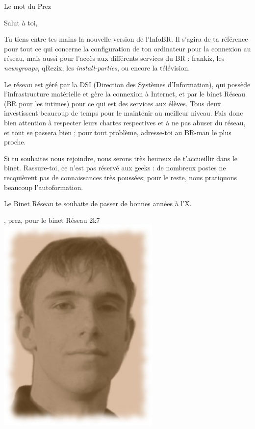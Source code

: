 

\begin{center}
    { \Huge Le mot du Prez }
\end{center}

\indent \indent Salut \`a toi,

Tu tiens entre tes mains la nouvelle version de l'InfoBR. Il s'agira de ta référence pour tout ce qui concerne la configuration de ton ordinateur pour la connexion au réseau, mais aussi pour l'accès aux différents services du BR :
frankiz, les \emph{newsgroups}, qRezix, les \emph{install-parties}, ou encore la télévision.

Le réseau est géré par la DSI (Direction des Systèmes d'Information), qui possède l'infrastructure matérielle et gère la connexion \`a Internet,
et par le binet Réseau (BR pour les intimes) pour ce qui est des services aux élèves. Tous deux investissent beaucoup de temps pour le maintenir au meilleur niveau.
Fais donc bien attention \`a respecter leurs chartes respectives et \`a ne pas abuser du réseau, et tout se passera bien ; pour tout problème, adresse-toi au
BR-man le plus proche.

Si tu souhaites nous rejoindre, nous serons très heureux de t'accueillir dans le binet. Rassure-toi, ce n'est pas réservé aux geeks : de nombreux postes ne recquièrent pas de connaissances très poussées; pour le reste, nous pratiquons beaucoup l'autoformation.

Le Binet Réseau te souhaite de passer de bonnes années \`a l'X.\\

\vspace*{1cm}
\begin{minipage}{0.45\textwidth}
\begin{center}
    , prez, pour le binet Réseau 2k7 \\
    \includegraphics[width=0.6\textwidth]{prez.jpg} 
\end{center}
\end{minipage}
